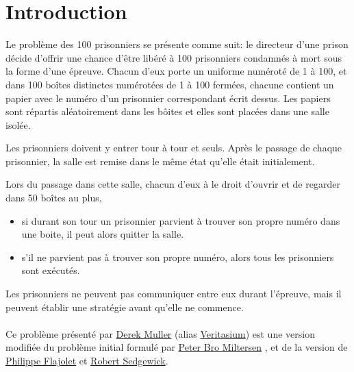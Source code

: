 \section{Introduction}

Le problème des 100 prisonniers \cite{100PrisonersProblem2023} se présente
comme suit:
le directeur d'une prison décide d'offrir une chance d'être libéré à 100 prisonniers
condamnés à mort sous la forme d'une épreuve.
Chacun d'eux porte un uniforme numéroté de 1 à 100, et dans 100 boîtes distinctes
numérotées de 1 à 100 fermées, chacune contient un papier avec le numéro d'un
prisonnier correspondant écrit dessus.
Les papiers sont répartis aléatoirement dans les bôites et elles sont placées dans une
salle isolée.

Les prisonniers doivent y entrer tour à tour et seuls.
Après le passage de chaque prisonnier, la salle est remise dans le même
état qu'elle était initialement.

Lors du passage dans cette salle, chacun d'eux à le droit d'ouvrir
et de regarder dans 50 boîtes au plus,

\begin{itemize}
	\item
	      si durant son tour un prisonnier parvient à trouver son propre numéro
	      dans une boite, il peut alors quitter la salle.
	\item
	      s'il ne parvient pas à trouver son propre numéro, alors tous les
	      prisonniers sont exécutés.
\end{itemize}

Les prisonniers ne peuvent pas communiquer entre eux durant l'épreuve,
mais il peuvent établir une stratégie avant qu'elle ne commence.\\\\
Ce problème présenté \cite{veritasiumRiddleThatSeems2022} par
\href{https://www.veritasium.com/about}{Derek Muller}
(alias \href{https://www.youtube.com/@veritasium}{Veritasium})
est une version modifiée du problème
initial \cite{miltersenCellProbeComplexity2007} formulé par
\href{https://pure.au.dk/portal/en/persons/bromille%40cs.au.dk}{Peter Bro Miltersen}
, et de la version \cite{flajoletAnalyticCombinatorics2009} de
\href{https://fr.wikipedia.org/wiki/Philippe_Flajolet}{Philippe Flajolet}
et \href{https://sedgewick.io/}{Robert Sedgewick}.
